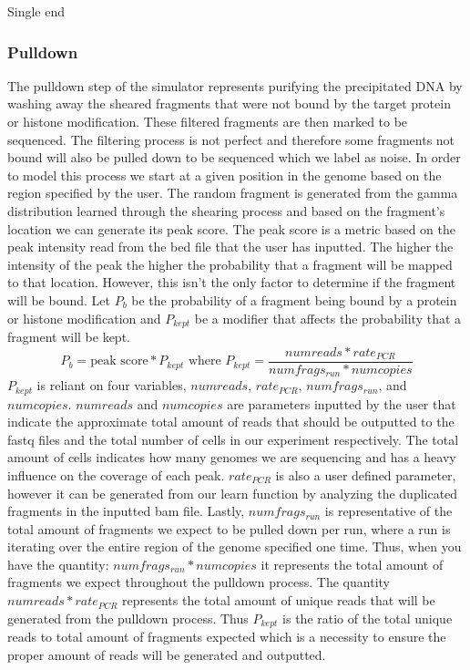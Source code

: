 \documentclass[12pt]{article}
\begin{document}
Single end


\subsubsection*{Pulldown}

The pulldown step of the simulator represents purifying the precipitated DNA by washing away the sheared fragments that were not bound by the target protein or histone modification. These filtered fragments are then marked to be sequenced. The filtering process is not perfect and therefore some fragments not bound will also be pulled down to be sequenced which we label as noise. In order to model this process we start at a given position in the genome based on the region specified by the user. The random fragment is generated from the gamma distribution learned through the shearing process and based on the fragment's location we can generate its peak score. The peak score is a metric based on the peak intensity read from the bed file that the user has inputted. The higher the intensity of the peak the higher the probability that a fragment will be mapped to that location. However, this isn't the only factor to determine if the fragment will be bound. Let $P_b$ be the probability of a fragment being bound by a protein or histone modification and $P_{kept}$ be a modifier that affects the probability that a fragment will be kept. 
$$P_b = \text{peak score} * P_{kept} \text{ where } P_{kept} = \dfrac{numreads * rate_{PCR}}{numfrags_{run} * numcopies}$$
$P_{kept}$ is reliant on four variables, $numreads$, $rate_{PCR}$, $numfrags_{run}$, and $numcopies$. $numreads$ and $numcopies$ are parameters inputted by the user that indicate the approximate total amount of reads that should be outputted to the fastq files and the total number of cells in our experiment respectively. The total amount of cells indicates how many genomes we are sequencing and has a heavy influence on the coverage of each peak. $rate_{PCR}$ is also a user defined parameter, however it can be generated from our learn function by analyzing the duplicated fragments in the inputted bam file. Lastly, $numfrags_{run}$ is representative of the total amount of fragments we expect to be pulled down per run, where a run is iterating over the entire region of the genome specified one time. Thus, when you have the quantity: $numfrags_{run}*numcopies$ it represents the total amount of fragments we expect throughout the pulldown process. The quantity $numreads*rate_{PCR}$ represents the total amount of unique reads that will be generated from the pulldown process. Thus $P_{kept}$ is the ratio of the total unique reads to total amount of fragments expected which is a necessity to ensure the proper amount of reads will be generated and outputted. 
\end{document}
